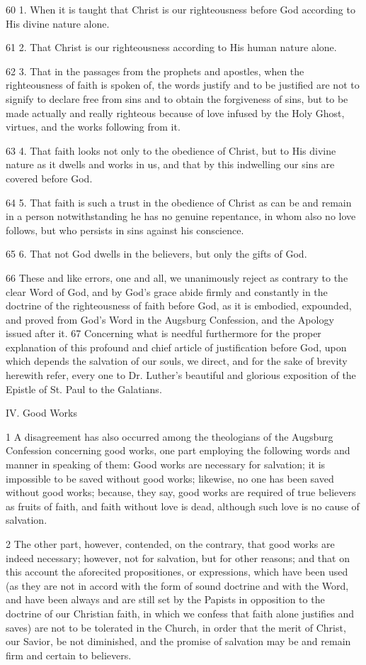 60 1. When it is taught that Christ is our righteousness before God according to His divine nature alone.

61 2. That Christ is our righteousness according to His human nature alone.

62 3. That in the passages from the prophets and apostles, when the righteousness of faith is spoken of, the words justify and to be justified are not to signify to declare free from sins and to obtain the forgiveness of sins, but to be made actually and really righteous because of love infused by the Holy Ghost, virtues, and the works following from it.

63 4. That faith looks not only to the obedience of Christ, but to His divine nature as it dwells and works in us, and that by this indwelling our sins are covered before God.

64 5. That faith is such a trust in the obedience of Christ as can be and remain in a person notwithstanding he has no genuine repentance, in whom also no love follows, but who persists in sins against his conscience.

65 6. That not God dwells in the believers, but only the gifts of God.

66 These and like errors, one and all, we unanimously reject as contrary to the clear Word of God, and by God’s grace abide firmly and constantly in the doctrine of the righteousness of faith before God, as it is embodied, expounded, and proved from God’s Word in the Augsburg Confession, and the Apology issued after it.
67 Concerning what is needful furthermore for the proper explanation of this profound and chief article of justification before God, upon which depends the salvation of our souls, we direct, and for the sake of brevity herewith refer, every one to Dr. Luther’s beautiful and glorious exposition of the Epistle of St. Paul to the Galatians.

IV. Good Works

1 A disagreement has also occurred among the theologians of the Augsburg Confession concerning good works, one part employing the following words and manner in speaking of them: Good works are necessary for salvation; it is impossible to be saved without good works; likewise, no one has been saved without good works; because, they say, good works are required of true believers as fruits of faith, and faith without love is dead, although such love is no cause of salvation.

2 The other part, however, contended, on the contrary, that good works are indeed necessary; however, not for salvation, but for other reasons; and that on this account the aforecited propositiones, or expressions, which have been used (as they are not in accord with the form of sound doctrine and with the Word, and have been always and are still set by the Papists in opposition to the doctrine of our Christian faith, in which we confess that faith alone justifies and saves) are not to be tolerated in the Church, in order that the merit of Christ, our Savior, be not diminished, and the promise of salvation may be and remain firm and certain to believers.

